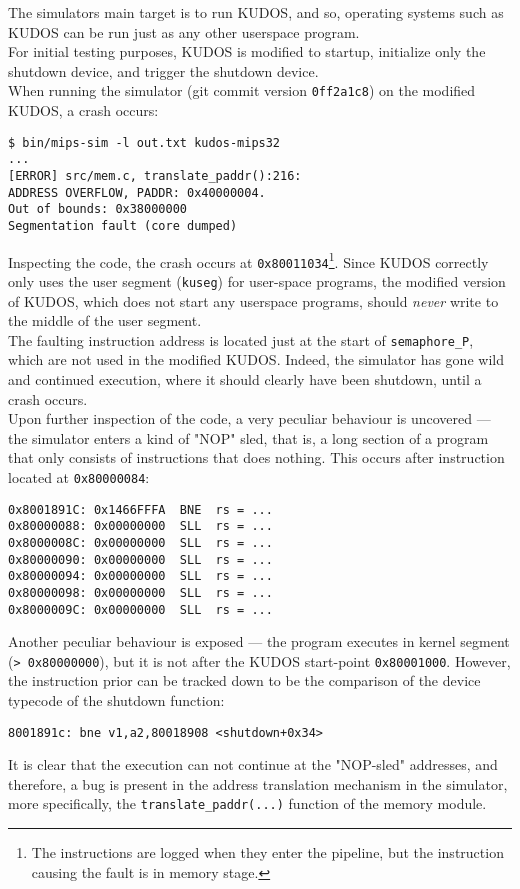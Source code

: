 The simulators main target is to run KUDOS, and so, operating systems such as KUDOS
can be run just as any other userspace program.\\
For initial testing purposes, KUDOS is modified to startup, initialize only
the shutdown device, and trigger the shutdown device.\\
When running the simulator (git commit version \texttt{0ff2a1c8}) on the modified
KUDOS, a crash occurs:
\begin{verbatim}
$ bin/mips-sim -l out.txt kudos-mips32
...
[ERROR] src/mem.c, translate_paddr():216:
ADDRESS OVERFLOW, PADDR: 0x40000004.
Out of bounds: 0x38000000
Segmentation fault (core dumped)
\end{verbatim}
Inspecting the code, the crash occurs at \texttt{0x80011034}\footnote{The instructions
are logged when they enter the pipeline, but the instruction causing the fault is
in memory stage.}. Since KUDOS correctly only uses the user segment (\texttt{kuseg})
for user-space programs, the modified version of KUDOS, which does not start
any userspace programs, should \textit{never} write to the middle of the user segment.\\
The faulting instruction address is located just at the start of \texttt{semaphore\_P},
which are not used in the modified KUDOS. Indeed, the simulator has gone wild and
continued execution, where it should clearly have been shutdown, until a crash
occurs.\\
Upon further inspection of the code, a very peculiar behaviour is uncovered ---
the simulator enters a kind of "NOP" sled, that is, a long section of a program
that only consists of instructions that does nothing. This occurs after instruction
located at \texttt{0x80000084}:
\begin{verbatim}
0x8001891C: 0x1466FFFA  BNE  rs = ...
0x80000088: 0x00000000  SLL  rs = ...
0x8000008C: 0x00000000  SLL  rs = ...
0x80000090: 0x00000000  SLL  rs = ...
0x80000094: 0x00000000  SLL  rs = ...
0x80000098: 0x00000000  SLL  rs = ...
0x8000009C: 0x00000000  SLL  rs = ...
\end{verbatim}
Another peculiar behaviour is exposed --- the program executes in kernel segment
(\texttt{> 0x80000000}), but it is not after the KUDOS start-point \texttt{0x80001000}.
However, the instruction prior can be tracked down to be the comparison of the
device typecode of the shutdown function:
\begin{verbatim}
8001891c: bne v1,a2,80018908 <shutdown+0x34>
\end{verbatim}

It is clear that the execution can not continue at the "NOP-sled" addresses,
and therefore, a bug is present in the address translation mechanism in the simulator,
more specifically, the \texttt{translate\_paddr(...)} function of the memory module.
